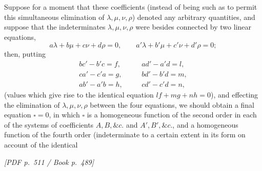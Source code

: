\documentclass[11pt]{article}
\newcommand{\Page}[2]{\bigskip\noindent\textit{[PDF p.~#1 / Book p.~#2]}\par\smallskip}
\newcommand{\sq}{\square}
\begin{document}
Suppose for a moment that these coefficients (instead of being such as to permit this
simultaneous elimination of $\lambda,\mu,\nu,\rho$) denoted any arbitrary quantities, and
suppose that the indeterminates $\lambda,\mu,\nu,\rho$ were besides connected by two
linear equations,
\[
a\lambda+b\mu+c\nu+d\rho=0,\qquad
a'\lambda+b'\mu+c'\nu+d'\rho=0;
\]
then, putting
\[
\begin{array}{lll}
bc'-b'c=f,&\quad&ad'-a'd=l,\\
ca'-c'a=g,&&bd'-b'd=m,\\
ab'-a'b=h,&&cd'-c'd=n,
\end{array}
\]
(values which give rise to the identical equation $lf+mg+nh=0$), and effecting the
elimination of $\lambda,\mu,\nu,\rho$ between the four equations, we should obtain a
final equation $\sq=0$, in which $\sq$ is a homogeneous function of the second order
in each of the systems of coefficients $A,B,\&c.$ and $A',B',\&c.$, and a homogeneous
function of the fourth order (indeterminate to a certain extent in its form on account
of the identical

\Page{511}{489}
\end{document}
